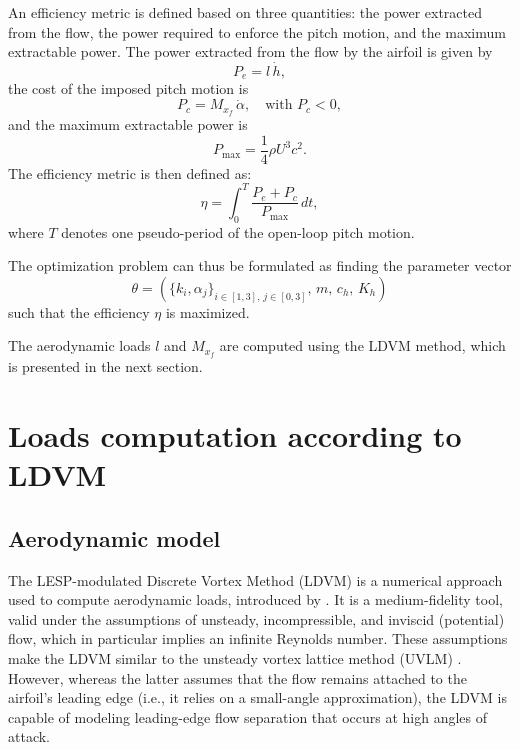 \documentclass[a4paper,12pt]{article}
\begin{document}
An efficiency metric is defined based on three quantities: the power extracted from the flow, the power required to enforce the pitch motion, and the maximum extractable power.
The power extracted from the flow by the airfoil is given by
\[
P_e = l\, \dot{h},
\]
the cost of the imposed pitch motion is
\[
P_c = M_{x_f}\, \dot{\alpha}, \quad \text{with } P_c < 0,
\]
and the maximum extractable power is
\[
P_{\text{max}} = \frac{1}{4} \rho U^3 c^2.
\]
The efficiency metric is then defined as:
\begin{equation}
\eta = \int_0^T \frac{P_e + P_c}{P_{\text{max}}} \, dt,
\label{eq:efficiency}
\end{equation}
where \( T \) denotes one pseudo-period of the open-loop pitch motion.

The optimization problem can thus be formulated as finding the parameter vector
\begin{equation}
\theta = \left( \{k_i, \alpha_j\}_{i \in [1,3],\, j \in [0,3]},\, m,\, c_h,\, K_h \right)
\label{eq:theta}
\end{equation}
such that the efficiency \( \eta \) is maximized.

The aerodynamic loads \( l \) and \( M_{x_f} \) are computed using the LDVM  method, which is presented in the next section.


\section{Loads computation according to LDVM}

\subsection{Aerodynamic model}
The LESP-modulated Discrete Vortex Method (LDVM) is a numerical approach used to compute aerodynamic loads, introduced by \cite{ramesh2014discrete}.  
It is a medium-fidelity tool, valid under the assumptions of unsteady, incompressible, and inviscid (potential) flow, which in particular implies an infinite Reynolds number.  
These assumptions make the LDVM similar to the unsteady vortex lattice method (UVLM) \cite{katz_plotkin}. However, whereas the latter assumes that the flow remains attached to the airfoil's leading edge (i.e., it relies on a small-angle approximation), the LDVM is capable of modeling leading-edge flow separation that occurs at high angles of attack.
\end{document}
